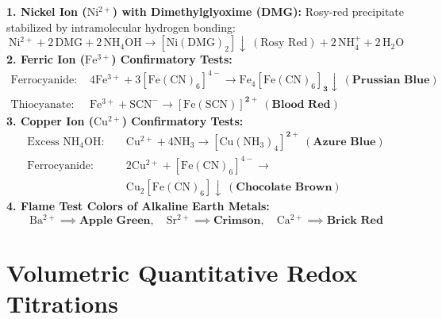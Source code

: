 \documentclass[10pt,twoside,openright]{book}
\begin{document}
\begin{formulabox}
\textbf{1. Nickel Ion ($\mathrm{Ni^{2+}}$) with Dimethylglyoxime (DMG):}
Rosy-red precipitate stabilized by intramolecular hydrogen bonding:
\begin{equation}
  \mathrm{Ni^{2+}} + 2\,\mathrm{DMG} + 2\,\mathrm{NH_4OH} \longrightarrow \mathbf{[\mathrm{Ni(DMG)_2}] \downarrow} \ (\text{Rosy Red}) + 2\,\mathrm{NH_4^+} + 2\,\mathrm{H_2O}
\end{equation}
\textbf{2. Ferric Ion ($\mathrm{Fe^{3+}}$) Confirmatory Tests:}
\begin{align*}
  \text{Ferrocyanide: } & 4\mathrm{Fe^{3+}} + 3[\mathrm{Fe(CN)_6}]^{4-} \longrightarrow \mathbf{\mathrm{Fe_4}[\mathrm{Fe(CN)_6}]_3 \downarrow} \ (\textbf{Prussian Blue})\\
  \text{Thiocyanate: } & \mathrm{Fe^{3+}} + \mathrm{SCN^-} \longrightarrow \mathbf{[\mathrm{Fe(SCN)}]^{2+}} \ (\textbf{Blood Red})
\end{align*}
\textbf{3. Copper Ion ($\mathrm{Cu^{2+}}$) Confirmatory Tests:}
\begin{align*}
  \text{Excess } \mathrm{NH_4OH}: \quad & \mathrm{Cu^{2+}} + 4\mathrm{NH_3} \longrightarrow \mathbf{[\mathrm{Cu(NH_3)_4}]^{2+}} \ (\textbf{Azure Blue})\\
  \text{Ferrocyanide: } & 2\mathrm{Cu^{2+}} + [\mathrm{Fe(CN)_6}]^{4-} \longrightarrow \\
  &\mathbf{\mathrm{Cu_2}[\mathrm{Fe(CN)_6}] \downarrow} \ (\textbf{Chocolate Brown})
\end{align*}
\textbf{4. Flame Test Colors of Alkaline Earth Metals:}
\begin{equation}
  \mathbf{\mathrm{Ba^{2+}} \implies \text{Apple Green}}, \quad \mathbf{\mathrm{Sr^{2+}} \implies \text{Crimson}}, \quad \mathbf{\mathrm{Ca^{2+}} \implies \text{Brick Red}}
\end{equation}
\end{formulabox}

\section{Volumetric Quantitative Redox Titrations}
\end{document}
